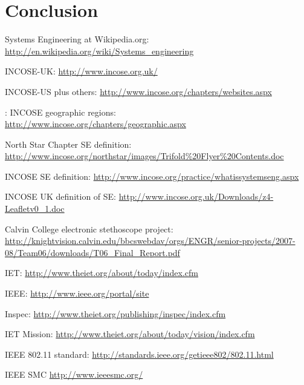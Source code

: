 \documentclass[a4paper,12pt]{article}
\begin{document}
%

\section{Conclusion}

\newpage
{}
\begin{thebibliography}{100}
	
 Systems Engineering at Wikipedia.org: \url{http://en.wikipedia.org/wiki/Systems_engineering}

 INCOSE-UK: \url{http://www.incose.org.uk/}

 INCOSE-US plus others: \url{http://www.incose.org/chapters/websites.aspx}

: INCOSE geographic regions:\\
\url{http://www.incose.org/chapters/geographic.aspx}

 North Star Chapter SE definition: \url{http://www.incose.org/northstar/images/Trifold%20Flyer%20Contents.doc}

 INCOSE SE definition: \url{http://www.incose.org/practice/whatissystemseng.aspx}

 INCOSE UK definition of SE: \url{http://www.incose.org.uk/Downloads/z4-Leafletv0_1.doc}

 Calvin College electronic stethoscope project: \url{http://knightvision.calvin.edu/bbcswebdav/orgs/ENGR/senior-projects/2007-08/Team06/downloads/T06_Final_Report.pdf}

 IET: \url{http://www.theiet.org/about/today/index.cfm}

 IEEE: \url{http://www.ieee.org/portal/site}

 Inspec: \url{http://www.theiet.org/publishing/inspec/index.cfm}

 IET Mission: \url{http://www.theiet.org/about/today/vision/index.cfm}

 IEEE 802.11 standard: \url{http://standards.ieee.org/getieee802/802.11.html}

 IEEE SMC \url{http://www.ieeesmc.org/}

\end{thebibliography}
\end{document}
